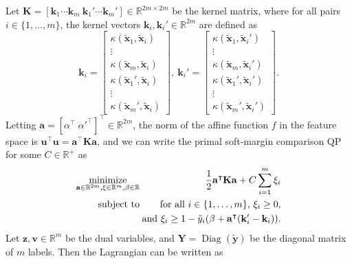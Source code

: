 \documentclass{article}
\newcommand{\RR}{\mathbb R}
\DeclareMathOperator*{\Diag}{Diag}
\DeclareMathOperator*{\minimize}{minimize}
\begin{document}
Let $\mathbf K=[
\mathbf k_1\cdots \mathbf k_m
\ \mathbf k_1'\cdots \mathbf k_m']\in\RR^{2m\times 2m}$ be the
kernel matrix, where for all pairs $i\in\{1, \dots, m\}$, the kernel
vectors $\mathbf k_i,\mathbf k_i'\in\RR^{2m}$ are defined as
\begin{equation}
  \mathbf k_i = \left[
    \begin{array}{c}
      \kappa(\mathbf{\tilde x}_1, \mathbf{\tilde x}_i)\\
      \vdots\\
      \kappa(\mathbf{\tilde x}_m, \mathbf{\tilde x}_i)\\
      \kappa(\mathbf{\tilde x}_1', \mathbf{\tilde x}_i)\\
      \vdots\\
      \kappa(\mathbf{\tilde x}_m', \mathbf{\tilde x}_i)
    \end{array}
  \right],\ 
  \mathbf k_i' = \left[
    \begin{array}{c}
      \kappa(\mathbf{\tilde x}_1, \mathbf{\tilde x}_i')\\
      \vdots\\
      \kappa(\mathbf{\tilde x}_m, \mathbf{\tilde x}_i')\\
      \kappa(\mathbf{\tilde x}_1', \mathbf{\tilde x}_i')\\
      \vdots\\
      \kappa(\mathbf{\tilde x}_m', \mathbf{\tilde x}_i')
    \end{array}
  \right].
\end{equation}
Letting $\mathbf a=[\alpha^\intercal\
\alpha'^\intercal]^\intercal\in\RR^{2m}$, the norm of the affine
function $f$ in the feature space is $\mathbf u^\intercal \mathbf u =
\mathbf a^\intercal \mathbf K \mathbf a$, and we can write the primal soft-margin
comparison QP for some $C\in\RR^+$ as
\begin{eqnarray}
  \minimize_{\mathbf a\in\RR^{2m},\mathbf \xi\in\RR^m,\beta\in\RR}\ \ &&\hskip -0.5cm 
  \frac 1 2 \mathbf a^\intercal \mathbf K \mathbf a + C\sum_{i=1}^m \xi_i \\
  \text{subject to}\ \ &&\hskip -0.5cm \nonumber
  \text{for all $i\in\{1,\dots,m\}$, }
  \xi_i \geq 0,\\
  &&\hskip -0.5cm \nonumber \text{and }
  \xi_i \geq 1-\tilde y_i(\beta + \mathbf a^\intercal (\mathbf k_i'-\mathbf k_i)).
\end{eqnarray}
Let $\mathbf z, \mathbf v\in\RR^m$ be the dual variables, and
$\mathbf Y=\Diag(\mathbf{\tilde y})$ be the diagonal matrix of $m$
labels. Then the Lagrangian can be written as
\end{document}
